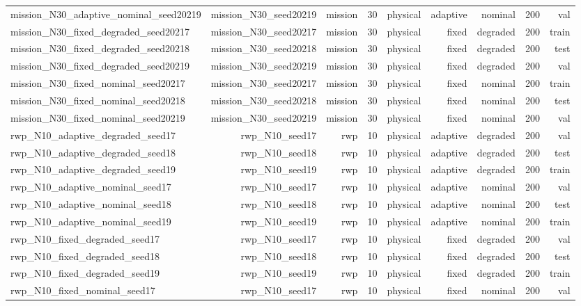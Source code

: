 \begin{tabular}{lrrrrrrrr}
mission\_N30\_adaptive\_nominal\_seed20219 & mission\_N30\_seed20219 & mission & 30 & physical & adaptive & nominal & 200 & val \\
mission\_N30\_fixed\_degraded\_seed20217 & mission\_N30\_seed20217 & mission & 30 & physical & fixed & degraded & 200 & train \\
mission\_N30\_fixed\_degraded\_seed20218 & mission\_N30\_seed20218 & mission & 30 & physical & fixed & degraded & 200 & test \\
mission\_N30\_fixed\_degraded\_seed20219 & mission\_N30\_seed20219 & mission & 30 & physical & fixed & degraded & 200 & val \\
mission\_N30\_fixed\_nominal\_seed20217 & mission\_N30\_seed20217 & mission & 30 & physical & fixed & nominal & 200 & train \\
mission\_N30\_fixed\_nominal\_seed20218 & mission\_N30\_seed20218 & mission & 30 & physical & fixed & nominal & 200 & test \\
mission\_N30\_fixed\_nominal\_seed20219 & mission\_N30\_seed20219 & mission & 30 & physical & fixed & nominal & 200 & val \\
rwp\_N10\_adaptive\_degraded\_seed17 & rwp\_N10\_seed17 & rwp & 10 & physical & adaptive & degraded & 200 & val \\
rwp\_N10\_adaptive\_degraded\_seed18 & rwp\_N10\_seed18 & rwp & 10 & physical & adaptive & degraded & 200 & test \\
rwp\_N10\_adaptive\_degraded\_seed19 & rwp\_N10\_seed19 & rwp & 10 & physical & adaptive & degraded & 200 & train \\
rwp\_N10\_adaptive\_nominal\_seed17 & rwp\_N10\_seed17 & rwp & 10 & physical & adaptive & nominal & 200 & val \\
rwp\_N10\_adaptive\_nominal\_seed18 & rwp\_N10\_seed18 & rwp & 10 & physical & adaptive & nominal & 200 & test \\
rwp\_N10\_adaptive\_nominal\_seed19 & rwp\_N10\_seed19 & rwp & 10 & physical & adaptive & nominal & 200 & train \\
rwp\_N10\_fixed\_degraded\_seed17 & rwp\_N10\_seed17 & rwp & 10 & physical & fixed & degraded & 200 & val \\
rwp\_N10\_fixed\_degraded\_seed18 & rwp\_N10\_seed18 & rwp & 10 & physical & fixed & degraded & 200 & test \\
rwp\_N10\_fixed\_degraded\_seed19 & rwp\_N10\_seed19 & rwp & 10 & physical & fixed & degraded & 200 & train \\
rwp\_N10\_fixed\_nominal\_seed17 & rwp\_N10\_seed17 & rwp & 10 & physical & fixed & nominal & 200 & val \\

\end{tabular}
